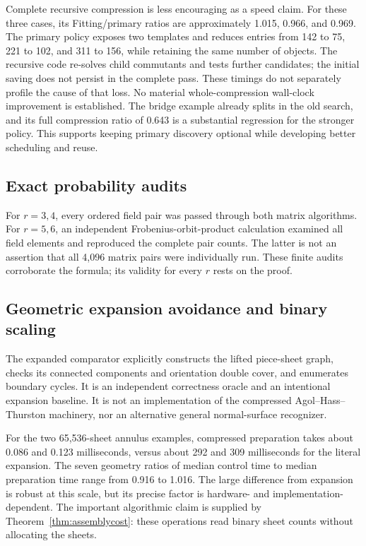 \documentclass[11pt,a4paper]{article}
\theoremstyle{definition}\newtheorem{definition}[theorem]{Definition}
\theoremstyle{remark}\newtheorem{remark}[theorem]{Remark}
\begin{document}
Complete recursive compression is less encouraging as a speed claim.
For these three cases, its Fitting/primary ratios are approximately 1.015,
0.966, and 0.969. The primary policy exposes two templates and reduces
entries from 142 to 75, 221 to 102, and 311 to 156, while retaining the same
number of objects. The recursive code re-solves child commutants and tests
further candidates; the initial saving does not persist in the complete
pass. These timings do not separately profile the cause of that loss.
No material whole-compression wall-clock improvement is established.
The bridge example already splits in the old search, and its full
compression ratio of 0.643 is a substantial regression for the stronger
policy. This supports keeping primary discovery optional while developing
better scheduling and reuse.

\subsection{Exact probability audits}



For $r=3,4$, every ordered field pair was passed through both matrix
algorithms. For $r=5,6$, an independent Frobenius-orbit-product calculation
examined all field elements and reproduced the complete pair counts. The
latter is not an assertion that all 4,096 matrix pairs were individually
run. These finite audits corroborate the formula; its validity for every
$r$ rests on the proof.

\subsection{Geometric expansion avoidance and binary scaling}



The expanded comparator explicitly constructs the lifted piece-sheet graph,
checks its connected components and orientation double cover, and enumerates
boundary cycles. It is an independent correctness oracle and an intentional
expansion baseline. It is not an implementation of the compressed
Agol--Hass--Thurston machinery, nor an alternative general normal-surface
recognizer.

For the two 65,536-sheet annulus examples, compressed preparation takes
about 0.086 and 0.123 milliseconds, versus about 292 and 309 milliseconds
for the literal expansion. The seven geometry ratios of median control
time to median preparation time range from
0.916 to 1.016. The large difference from expansion is robust at this scale,
but its precise factor is hardware- and implementation-dependent. The
important algorithmic claim is supplied by Theorem~\ref{thm:assemblycost}:
these operations read binary sheet counts without allocating the sheets.
\end{document}
